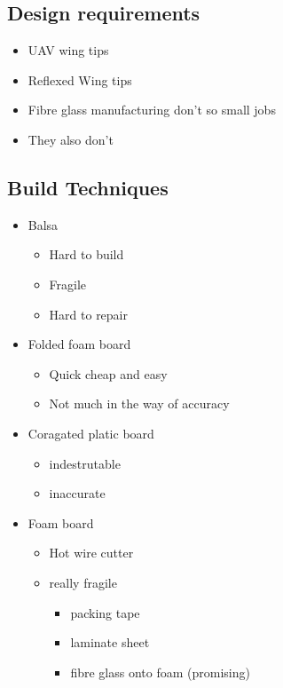 \documentclass[11pt]{article}
\providecommand{\tightlist}{%
      \setlength{\itemsep}{0pt}\setlength{\parskip}{0pt}}
\begin{document}
    \hypertarget{design-requirements}{%
\subsection{Design requirements}\label{design-requirements}}

\begin{itemize}
\tightlist
\item
  UAV wing tips
\item
  Reflexed Wing tips
\item
  Fibre glass manufacturing don't so small jobs
\item
  They also don't
\end{itemize}

    \hypertarget{build-techniques}{%
\subsection{Build Techniques}\label{build-techniques}}

\begin{itemize}
\tightlist
\item
  Balsa

  \begin{itemize}
  \tightlist
  \item
    Hard to build
  \item
    Fragile
  \item
    Hard to repair
  \end{itemize}
\item
  Folded foam board

  \begin{itemize}
  \tightlist
  \item
    Quick cheap and easy
  \item
    Not much in the way of accuracy
  \end{itemize}
\item
  Coragated platic board

  \begin{itemize}
  \tightlist
  \item
    indestrutable
  \item
    inaccurate
  \end{itemize}
\item
  Foam board

  \begin{itemize}
  \tightlist
  \item
    Hot wire cutter
  \item
    really fragile

    \begin{itemize}
    \tightlist
    \item
      packing tape
    \item
      laminate sheet
    \item
      fibre glass onto foam (promising)
    \end{itemize}
  \end{itemize}
\end{itemize}
\end{document}
